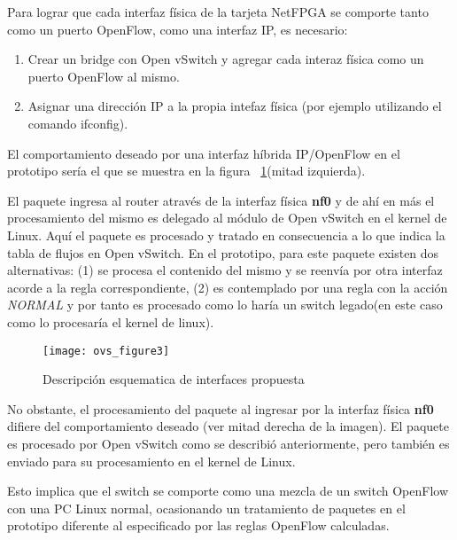 \begin{enumerate}
Para lograr que cada interfaz f\'isica de la tarjeta NetFPGA se comporte tanto como un puerto OpenFlow, como una interfaz IP, es necesario:

\begin{enumerate}
\item Crear un bridge con Open vSwitch y agregar cada interaz f\'isica como un puerto OpenFlow al mismo.
\item Asignar una dirección IP a la propia intefaz f\'isica (por ejemplo utilizando el comando ifconfig).
\end{enumerate}


El comportamiento deseado por una interfaz h\'ibrida IP/OpenFlow en el prototipo ser\'ia el que se muestra en la figura ~\ref{fig:OVSInterfaces}(mitad izquierda).

El paquete ingresa al router atrav\'es de la interfaz f\'isica \textbf{nf0} y de ah\'i en m\'as el procesamiento del mismo es delegado al m\'odulo de Open vSwitch en el kernel de Linux. Aqu\'i el paquete es procesado y tratado en consecuencia a lo que indica la tabla de flujos en Open vSwitch. En el prototipo, para este paquete existen dos alternativas: (1) se procesa el contenido del mismo y se reenv\'ia por otra interfaz acorde a la regla correspondiente, (2) es contemplado por una regla con la acci\'on \textit{NORMAL} y por tanto es procesado como lo har\'ia un switch legado(en este caso como lo procesar\'ia el kernel de linux).\\

\begin{figure}[h!] 
\centering    
\texttt{[image: ovs\_figure3]}
\caption[OVSInterfaces]{Descripci\'on esquematica de interfaces propuesta}
\label{fig:OVSInterfaces}
\end{figure}

No obstante, el procesamiento del paquete al ingresar por la interfaz f\'isica \textbf{nf0} difiere del comportamiento deseado (ver mitad derecha de la imagen). El paquete es procesado por Open vSwitch como se describi\'o anteriormente, pero tambi\'en es enviado para su procesamiento en el kernel de Linux.

Esto implica que el switch se comporte como una mezcla de un switch OpenFlow  con una PC Linux normal, ocasionando un tratamiento de paquetes en el prototipo diferente al especificado por las reglas OpenFlow calculadas.\\


\end{enumerate}
